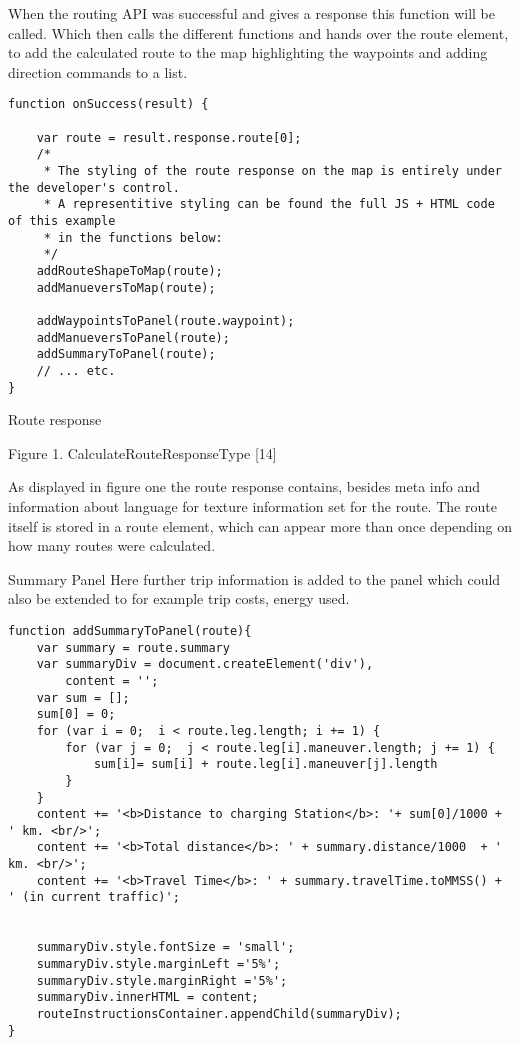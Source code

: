 When the routing API was successful and gives a response this function will be called. Which then calls the different functions and hands over the route element, to add the calculated route to the map highlighting the waypoints and adding direction commands to a list. 

\begin{verbatim}
function onSuccess(result) {

    var route = result.response.route[0];
    /*
     * The styling of the route response on the map is entirely under the developer's control.
     * A representitive styling can be found the full JS + HTML code of this example
     * in the functions below:
     */
    addRouteShapeToMap(route);
    addManueversToMap(route);

    addWaypointsToPanel(route.waypoint);
    addManueversToPanel(route);
    addSummaryToPanel(route);
    // ... etc.
}

\end{verbatim}

Route response

Figure 1. CalculateRouteResponseType [14]

As displayed in figure one the route response contains, besides meta info and information about language for texture information set for the route. The route itself is stored in a route element, which can appear more than once depending on how many routes were calculated. 


















Summary Panel
Here further trip information is added to the panel which could also be extended to for example trip costs, energy used.

\begin{verbatim}
function addSummaryToPanel(route){
    var summary = route.summary
    var summaryDiv = document.createElement('div'),
        content = '';
    var sum = [];
    sum[0] = 0;
    for (var i = 0;  i < route.leg.length; i += 1) {
        for (var j = 0;  j < route.leg[i].maneuver.length; j += 1) {
            sum[i]= sum[i] + route.leg[i].maneuver[j].length
        }
    }
    content += '<b>Distance to charging Station</b>: '+ sum[0]/1000 + ' km. <br/>';
    content += '<b>Total distance</b>: ' + summary.distance/1000  + ' km. <br/>';
    content += '<b>Travel Time</b>: ' + summary.travelTime.toMMSS() + ' (in current traffic)';


    summaryDiv.style.fontSize = 'small';
    summaryDiv.style.marginLeft ='5%';
    summaryDiv.style.marginRight ='5%';
    summaryDiv.innerHTML = content;
    routeInstructionsContainer.appendChild(summaryDiv);
}
\end{verbatim}

